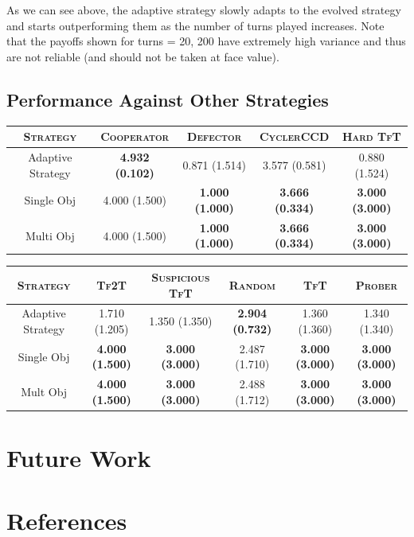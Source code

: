 \documentclass[a4paper]{article}
\begin{document}
	As we can see above, the adaptive strategy slowly adapts to the evolved strategy and starts outperforming them as the number of turns played increases. Note that the payoffs shown for turns = 20, 200 have extremely high variance and thus are not reliable (and should not be taken at face value).
	
	\subsection{Performance Against Other Strategies}
	
	\renewcommand{\tabcolsep}{8pt}

	\begin{table}[H]
	  \begin{center}
	    \begin{tabular}{|c|c|c|c|c|}
	      \toprule
	 	  \textsc{Strategy} & \textsc{Cooperator} & \textsc{Defector} & \textsc{CyclerCCD} & \textsc{Hard TfT}\\
		  \midrule
		  Adaptive Strategy & \textbf{4.932} \textbf{(0.102)} & 0.871 (1.514) & 3.577 (0.581) & 0.880 (1.524)\\
		  Single Obj & 4.000 (1.500) & \textbf{1.000 (1.000)} & \textbf{3.666 (0.334)} & \textbf{3.000 (3.000)}\\
		  Multi Obj & 4.000 (1.500) & \textbf{1.000 (1.000)} &  \textbf{3.666 (0.334)} & \textbf{3.000 (3.000)}\\
		\bottomrule
	    \end{tabular}
	  \end{center}
	\end{table}  		

	\renewcommand{\tabcolsep}{6pt}

	\begin{table}[H]
	  \begin{center}
	  	\footnotesize
	    \begin{tabular}{|c|c|c|c|c|c|}
	      \toprule
	 	  \textsc{Strategy} & \textsc{Tf2T} & {\footnotesize{\textsc{Suspicious TfT}}} & \textsc{Random} & \textsc{TfT} & \textsc{Prober}\\
		  \midrule
		  Adaptive Strategy & 1.710 {(1.205)} & 1.350 (1.350) & \textbf{2.904 (0.732)} & 1.360 (1.360) & 1.340 (1.340)\\
		  Single Obj & \textbf{4.000} \textbf{(1.500)} & \textbf{3.000 (3.000)} & 2.487 (1.710) & \textbf{3.000 (3.000)} & \textbf{3.000 (3.000)}\\
		  Mult Obj & \textbf{4.000} \textbf{(1.500)} & \textbf{3.000 (3.000)} & 2.488 (1.712) & \textbf{3.000 (3.000)} & \textbf{3.000 (3.000)}\\
		  \bottomrule
	    \end{tabular}
	  \end{center}
	\end{table}  		

	\section{Future Work}
			
	\section{References}
\end{document}
